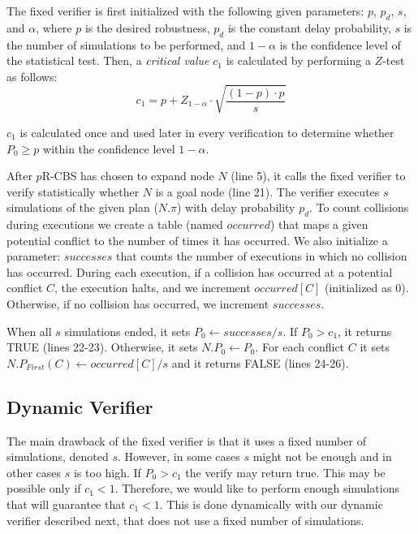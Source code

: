 \documentclass{article}
\newcommand{\prcbs}{$p$R-CBS\xspace}
\begin{document}
The fixed verifier is first initialized with the following given parameters: $p$, $p_d$, $s$, and $\alpha$, where $p$ is the desired robustness, $p_d$ is the constant delay probability, $s$ is the number of simulations to be performed, and $1-\alpha$ is the confidence level of the statistical test. Then, a {\em critical value} $c_1$ is calculated by performing a $Z$-test as follows:
\begin{equation}
c_1=p+Z_{1-\alpha} \cdot \sqrt{\frac{(1-p) \cdot p}{s}}
\label{equ:critical}
\end{equation}

$c_1$ is calculated once and used later in every verification to determine whether $P_0 \geq p$ within the confidence level $1-\alpha$.

After \prcbs{} has chosen to expand node $N$ (line 5), it calls the fixed verifier to verify statistically whether $N$ is a goal node (line 21). The verifier executes $s$ simulations of the given plan ($N.\pi$) with delay probability $p_d$. To count collisions during executions we create a table (named $\mathit{occurred}$) that maps a given potential conflict to the number of times it has occurred. We also initialize a parameter: $\mathit{successes}$ that counts the number of executions in which no collision has occurred. During each execution, if a collision has occurred at a potential conflict $C$, the execution halts, and we increment $\mathit{occurred[C]}$ (initialized as $0$). Otherwise, if no collision has occurred, we increment $\mathit{successes}$.

When all $s$ simulations ended, it sets $P_0 \gets \mathit{successes}/s$. If $P_0 > c_1$, it returns TRUE (lines 22-23). Otherwise, it sets $N.P_0 \gets P_0$. For each conflict $C$ it sets $N.P_{First}(C) \gets \mathit{occurred[C]}/{s}$ and it returns FALSE (lines 24-26).

\subsection{Dynamic Verifier}

The main drawback of the fixed verifier is that it uses a fixed number of simulations, denoted $s$. However, in some cases $s$ might not be enough and in other cases $s$ is too high. If $P_0 > c_1$ the verify may return true. This may be possible only if $c_1 < 1$. Therefore, we would like to perform enough simulations that will guarantee that $c_1<1$. This is done dynamically with our dynamic verifier described next, that does not use a fixed number of simulations.  
\end{document}
